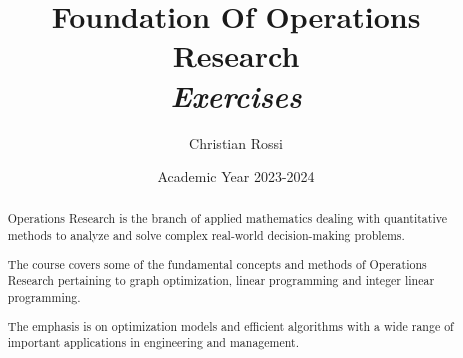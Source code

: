 \documentclass[12pt, a4paper]{report}
\title{Foundation Of Operations Research \\ \textit{Exercises}}
\author{Christian Rossi}
\date{Academic Year 2023-2024}
\newtheorem[style=M,bodystyle=\normalfont]{theorem}{Theorem}
\newtheorem[style=M,bodystyle=\normalfont]{corollary}{Corollary}
\newtheorem[style=M,bodystyle=\normalfont]{lemma}{Lemma}
\newtheorem[style=M,bodystyle=\normalfont]{definition}{Definition}
\begin{document}
\maketitle

\newpage

\begin{abstract}
    Operations Research is the branch of applied mathematics dealing with quantitative methods to analyze and solve
    complex real-world decision-making problems. 
    
    The course covers some of the fundamental concepts and methods of Operations Research pertaining to graph optimization, 
    linear programming and integer linear programming. 
    
    The emphasis is on optimization models and efficient algorithms with a wide range of important applications in 
    engineering and management.  
\end{abstract}

\newpage

\tableofcontents

\newpage
\end{document}
